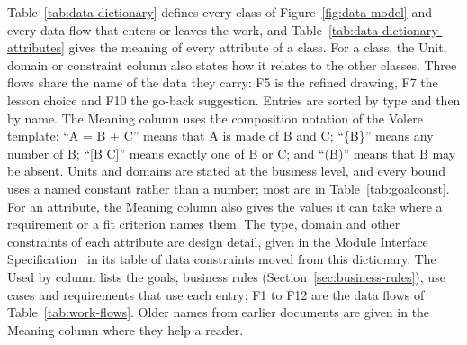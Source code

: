 \documentclass[12pt]{article}
\renewcommand{\_}{\textunderscore\allowbreak}%
\begin{document}
Table~\ref{tab:data-dictionary} defines every class of
Figure~\ref{fig:data-model} and every data flow that enters or leaves the work,
and Table~\ref{tab:data-dictionary-attributes} gives the meaning of every
attribute of a class. For a class, the Unit, domain or constraint column
also states how it relates to the other classes. Three flows share the name of
the data they carry: F5 is the refined drawing, F7 the lesson choice and F10 the
go-back suggestion. Entries are sorted by type and then by name. The Meaning
column uses the composition notation of the Volere template: ``A = B + C'' means
that A is made of B and C; ``\{B\}'' means any number of B; ``[B \textbar{} C]''
means exactly one of B or C; and ``(B)'' means that B may be absent. Units and
domains are stated at the business level, and every bound uses a named constant
rather than a number; most are in Table~\ref{tab:goalconst}. For an attribute, the Meaning column
also gives the values it can take where a requirement or a fit criterion names
them. The type, domain and other constraints of each attribute are design
detail, given in the Module Interface Specification~\citep{MIS} in its table of
data constraints moved from this dictionary. The Used by column
lists the goals, business rules (Section~\ref{sec:business-rules}), use cases
and requirements that use each entry; F1 to F12 are the data flows of
Table~\ref{tab:work-flows}. Older names from earlier documents are given in the
Meaning column where they help a reader.
\end{document}
